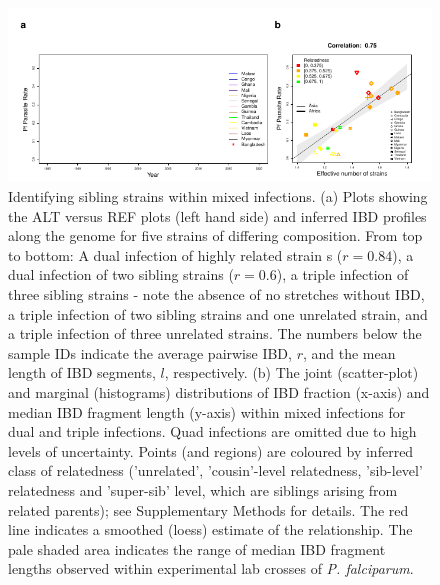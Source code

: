 \documentclass[9pt,lineno]{elife}
\begin{document}
\begin{figure}[h]
  \begin{center}
  \includegraphics[width=\textwidth]{Fig4.pdf}
   \caption{Identifying sibling strains within mixed infections.  (a) Plots showing the ALT versus REF plots (left hand side) and inferred IBD profiles along the genome for five strains of differing composition.  From top to bottom: A dual infection of highly related strain s ($r=0.84$), a dual infection of two sibling strains ($r=0.6$), a triple infection of three sibling strains - note the absence of no stretches without IBD, a triple infection of two sibling strains and one unrelated strain, and a triple infection of three unrelated strains.  The numbers below the sample IDs indicate the average pairwise IBD, $r$, and the mean length of IBD segments, $l$, respectively.  (b) The joint (scatter-plot) and marginal (histograms) distributions of IBD fraction (x-axis) and median IBD fragment length (y-axis) within mixed infections for dual and triple infections.  Quad infections are omitted due to high levels of uncertainty. Points (and regions) are coloured by inferred class of relatedness ('unrelated', 'cousin'-level relatedness, 'sib-level' relatedness and 'super-sib' level, which are siblings arising from related parents); see Supplementary Methods for details.  The red line indicates a smoothed (loess) estimate of the relationship. The pale shaded area indicates the range of median IBD fragment lengths observed within experimental lab crosses of {\it P. falciparum}.}\label{fig:strainIBD}
   \end{center}
\end{figure}
\end{document}
